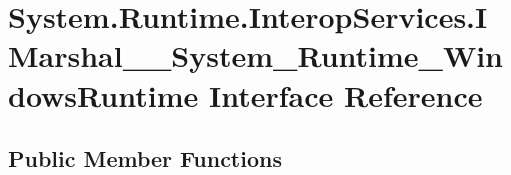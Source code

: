 \hypertarget{interface_system_1_1_runtime_1_1_interop_services_1_1_i_marshal_____system___runtime___windows_runtime}{}\section{System.\+Runtime.\+Interop\+Services.\+I\+Marshal\+\_\+\+\_\+\+System\+\_\+\+Runtime\+\_\+\+Windows\+Runtime Interface Reference}
\label{interface_system_1_1_runtime_1_1_interop_services_1_1_i_marshal_____system___runtime___windows_runtime}
\subsection*{Public Member Functions}

